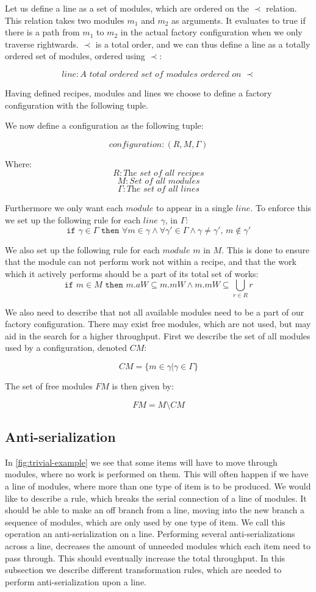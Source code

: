 Let us define a line as a set of modules, which are ordered on the $\prec$ relation. This relation takes two modules $m_1$ and $m_2$ as arguments. It evaluates to true if there is a path from $m_1$ to $m_2$ in the actual factory configuration when we only traverse rightwards. $\prec$ is a total order, and we can thus define a line as a totally ordered set of modules, ordered using $\prec$:

\[line: \textit{A total ordered set of modules ordered on } \prec\]

Having defined recipes, modules and lines we choose to define a factory configuration with the following tuple. 

We now define a configuration as the following tuple:

\[configuration: (R, M, \Gamma)\]

Where:
\[R: \textit{The set of all recipes}\]
\[M: \textit{Set of all modules}\]
\[\Gamma: \textit{The set of all lines}\]


Furthermore we only want each $module$ to appear in a single $line$. To enforce this we set up the following rule for each $line$ $\gamma$, in $\Gamma$:
\[\texttt{if } \gamma \in \Gamma \texttt{ then } \forall m \in \gamma \land \forall \gamma ' \in \Gamma \land \gamma \neq \gamma ',\, m \notin \gamma ' \]


We also set up the following rule for each $module$ $m$ in $M$. This is done to ensure that the module can not perform work not within a recipe, and that the work which it actively performs should be a part of its total set of works:
\[\texttt{if } m \in M \texttt{ then } m.aW \subseteq m.mW \land m.mW \subseteq  \bigcup_{r\in R}r\] 

We also need to describe that not all available modules need to be a part of our factory configuration. There may exist free modules, which are not used, but may aid in the search for a higher throughput. First we describe the set of all modules used by a configuration, denoted $CM$:

\[CM = \{m \in \gamma | \gamma \in \Gamma \}\]

The set of free modules $FM$ is then given by:

\[FM = M \setminus CM \]


\subsection{Anti-serialization}
In \cref{fig:trivial-example} we see that some items will have to move through modules, where no work is performed on them. This will often happen if we have a line of modules, where more than one type of item is to be produced. We would like to describe a rule, which breaks the serial connection of a line of modules. It should be able to make an off branch from a line, moving into the new branch a sequence of modules, which are only used by one type of item. We call this operation an anti-serialization on a line. Performing several anti-serializations across a line, decreases the amount of unneeded modules which each item need to pass through. This should eventually increase the total throughput. In this subsection we describe different transformation rules, which are needed to perform anti-serialization upon a line.

